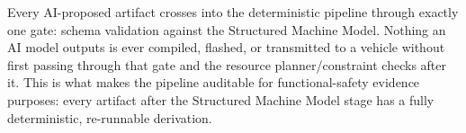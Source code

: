 Every AI-proposed artifact crosses into the deterministic pipeline through exactly one gate: schema validation against the Structured Machine Model. Nothing an AI model outputs is ever compiled, flashed, or transmitted to a vehicle without first passing through that gate and the resource planner/constraint checks after it. This is what makes the pipeline auditable for functional-safety evidence purposes: every artifact after the Structured Machine Model stage has a fully deterministic, re-runnable derivation.
